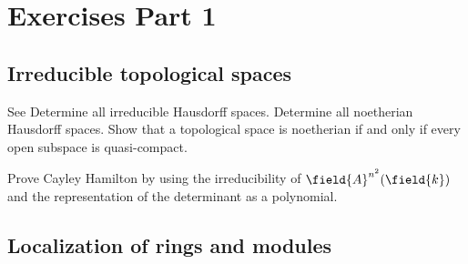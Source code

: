\chapter{Exercises Part 1}

\section{Irreducible topological spaces}

\begin{exercise}
  See \cite[Exercise 1.3]{görtz2010algebraic}
  Determine all irreducible Hausdorff spaces. Determine all noetherian Hausdorff spaces. Show that a topological space is noetherian if and only if every open subspace is quasi-compact.
\end{exercise}

\begin{exercise}
  Prove Cayley Hamilton by using the irreducibility of
  $\field{A}^{n^2}(\field{k})$ and the representation of the
  determinant as a polynomial.
\end{exercise}

\section{Localization of rings and modules}

